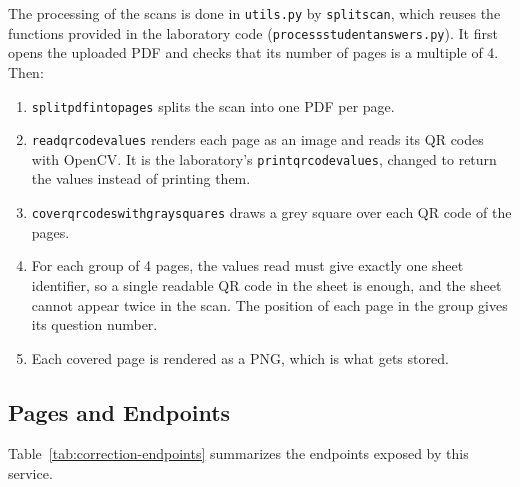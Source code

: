 \documentclass[letterpaper, 10 pt, conference]{ieeeconf}
\renewcommand{\_}{\textunderscore\allowbreak}
\begin{document}
The processing of the scans is done in \texttt{utils.py} by \texttt{split\_scan}, which reuses the functions provided in the laboratory code (\texttt{process\_student\_answers.py}). It first opens the uploaded PDF and checks that its number of pages is a multiple of 4. Then:
\begin{enumerate}
    \item \texttt{split\_pdf\_into\_pages} splits the scan into one PDF per page.
    \item \texttt{read\_qr\_code\_values} renders each page as an image and reads its QR codes with OpenCV. It is the laboratory's \texttt{print\_qr\_code\_values}, changed to return the values instead of printing them.
    \item \texttt{cover\_qr\_codes\_with\_gray\_squares} draws a grey square over each QR code of the pages.
    \item For each group of 4 pages, the values read must give exactly one sheet identifier, so a single readable QR code in the sheet is enough, and the sheet cannot appear twice in the scan. The position of each page in the group gives its question number.
    \item Each covered page is rendered as a PNG, which is what gets stored.
\end{enumerate}

\subsection{Pages and Endpoints}

Table~\ref{tab:correction-endpoints} summarizes the endpoints exposed by this service.
\end{document}
